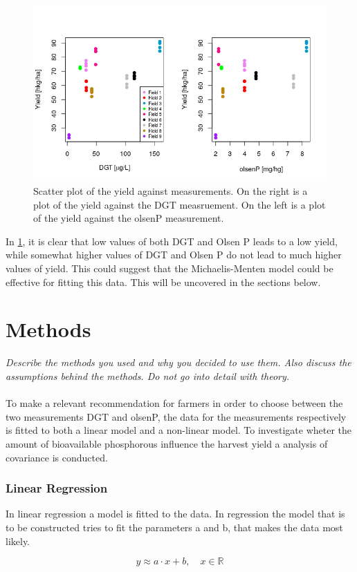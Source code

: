 \documentclass[11pt, fleqn, titlepage]{article}
\begin{document}
\begin{figure}[H]
	\centering
	\includegraphics[width=0.7\linewidth]{billeder/measurementz}
	\caption{Scatter plot of the yield against measurements. On the right is a plot of the yield against the DGT measruement. On the left is a plot of the yield against the olsenP measurement.}
	\label{fig:measurementz}
\end{figure}

In \ref{fig:measurementz}, it is clear that low values of both DGT and Olsen P leads to a low yield, while somewhat higher values of DGT and Olsen P do not lead to much higher values of yield. This could suggest that the Michaelis-Menten model could be effective for fitting this data. This will be uncovered in the sections below.

\section{Methods}
\textit{Describe the methods you used and why you decided to use them. Also discuss the assumptions behind the methods. Do not go into detail with theory.}\\\\ 
To make a relevant recommendation for farmers in order to choose between the two measurements DGT and olsenP, the data for the measurements respectively is fitted to both a linear model and a non-linear model. To investigate wheter the amount of bioavailable phosphorous influence the harvest yield a analysis of covariance is conducted.

\subsubsection*{Linear Regression}
In linear regression a model is fitted to the data. In regression the model that is to be constructed tries to fit the parameters a and b, that makes the data most likely.

\[ y \approx a \cdot x + b, \quad x \in \mathbb R  \]
\end{document}
